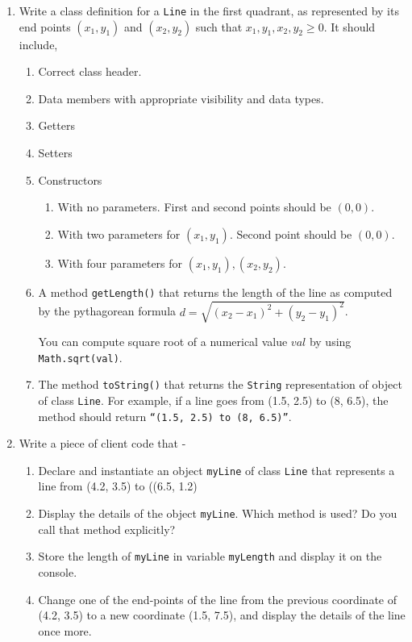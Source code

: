 \documentclass{exam}
\begin{document}
\begin{questions}
\begin{enumerate}
\item Write a class definition for a \texttt{Line} in the first quadrant, as represented by its end points $(x_1, y_1)$ and $(x_2, y_2)$ such that $x_1, y_1, x_2, y_2 \geq 0$. It should include,

\begin{enumerate}
\item Correct class header.
\item Data members with appropriate visibility and data types.
\item Getters
\item Setters
\item Constructors
	\begin{enumerate}
		\item With no parameters. First and second points should be $(0, 0)$.
		\item With two parameters for $(x_1, y_1)$. Second point should be $(0, 0)$.
		\item With four parameters for $(x_1, y_1), (x_2, y_2)$.
	\end{enumerate}
\item A method \texttt{getLength()} that returns the length of the line as computed by the pythagorean formula 
\vskip 0.5cm
$d = \sqrt{(x_2 - x_1)^2 + (y_2 - y_1)^2}$.

You can compute square root of a numerical value $val$ by using \texttt{Math.sqrt(val)}.

\item The method \texttt{toString()} that returns the \texttt{String} representation of object of class \texttt{Line}. For example, if a line goes from (1.5, 2.5) to (8, 6.5), the method should return \texttt{``(1.5, 2.5) to (8, 6.5)''}.
\end{enumerate}

\item Write a piece of client code that -

\begin{enumerate}
\item Declare and instantiate an object \texttt{myLine} of class \texttt{Line} that represents a line from (4.2, 3.5) to ((6.5, 1.2)
\item Display the details of the object \texttt{myLine}. Which method is used? Do you call that method explicitly?
\item Store the length of \texttt{myLine} in variable \texttt{myLength} and display it on the console.
\item Change one of the end-points of the line from the previous coordinate of (4.2, 3.5) to a new coordinate (1.5, 7.5), and display the details of the line once more.
\end{enumerate}
\end{enumerate}


\end{questions}
\end{document}

